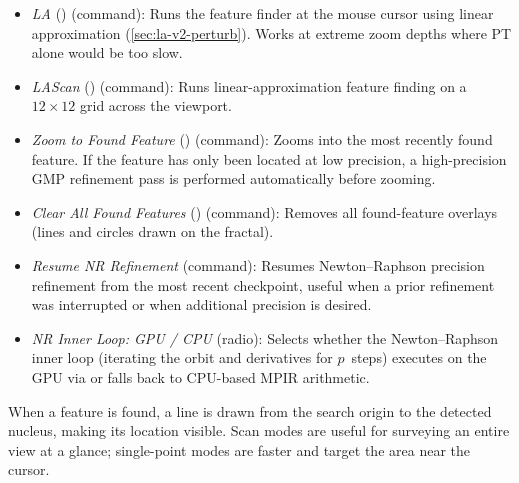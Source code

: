 \begin{itemize}
\begin{itemize}
\begin{itemize}
          feature finding on a $12\times12$ grid across the viewport.
          \item \emph{LA} (\code{,}) (command): Runs the feature finder at the
          mouse cursor using linear approximation (\cref{sec:la-v2-perturb}).
          Works at extreme zoom depths where PT alone would be too slow.
          \item \emph{LAScan} (\code{<}) (command): Runs linear-approximation
          feature finding on a $12\times12$ grid across the viewport.
          \item \emph{Zoom to Found Feature} () (command): Zooms into
          the most recently found feature.  If the feature has only been located
          at low precision, a high-precision GMP refinement pass is performed
          automatically before zooming.
          \item \emph{Clear All Found Features} (\code{>}) (command): Removes
          all found-feature overlays (lines and circles drawn on the fractal).
          \item \emph{Resume NR Refinement} (command): Resumes
          Newton--Raphson precision refinement from the most recent checkpoint,
          useful when a prior refinement was interrupted or when additional
          precision is desired.
          \item \emph{NR Inner Loop: GPU / CPU} (radio): Selects
          whether the Newton--Raphson inner loop (iterating the orbit and
          derivatives for $p$~steps) executes on the GPU via
           or falls back to CPU-based MPIR arithmetic.
        \end{itemize}
      When a feature is found, a line is drawn from the search origin to the
      detected nucleus, making its location visible.  Scan modes are useful for
      surveying an entire view at a glance; single-point modes are faster and
      target the area near the cursor.
    \end{itemize}


\end{itemize}
